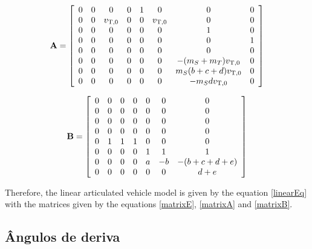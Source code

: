 \documentclass[sublist]{fei}
\begin{document}
\begin{equation} \label{matrixA}
{\bf A} = \left[ \begin{array}{cccccccc} 0 & 0 &  0 & 0 & 1 &  0 &                 0 & 0 \\
                                0 & 0 & v_{{\rm T},0} & 0 & 0 & v_{{\rm T},0} &                 0 & 0 \\
                                0 & 0 &  0 & 0 & 0 &  0 &                 1 & 0 \\
                                0 & 0 &  0 & 0 & 0 &  0 &                 0 & 1 \\
                                0 & 0 &  0 & 0 & 0 &  0 &                 0 & 0 \\
                                0 & 0 &  0 & 0 & 0 &  0 &     -(m_S + m_T) v_{{\rm T},0} & 0 \\
                                0 & 0 &  0 & 0 & 0 &  0 & m_S (b + c + d) v_{{\rm T},0} & 0 \\
                                0 & 0 &  0 & 0 & 0 &  0 &          - m_S d v_{{\rm T},0} & 0 \end{array} \right]
\end{equation}

\begin{equation} \label{matrixB}
    {\bf B} = \left[ \begin{array}{cccccccc}
0 & 0 & 0 & 0 & 0 &  0 &               0 \\
0 & 0 & 0 & 0 & 0 &  0 &               0 \\
0 & 0 & 0 & 0 & 0 &  0 &               0 \\
0 & 0 & 0 & 0 & 0 &  0 &               0 \\
0 & 1 & 1 & 1 & 0 &  0 &               0 \\
0 & 0 & 0 & 0 & 1 &  1 &               1 \\
0 & 0 & 0 & 0 & a & - b & - (b + c + d + e) \\
0 & 0 & 0 & 0 & 0 &  0 &           d + e \end{array} \right]
\end{equation}

Therefore, the linear articulated vehicle model is given by the equation \eqref{linearEq} with the matrices given by the equations \eqref{matrixE}, \eqref{matrixA} and \eqref{matrixB}.

\subsection{Ângulos de deriva}
\end{document}
